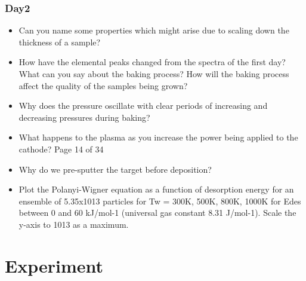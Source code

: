 \documentclass[]{article}
\begin{document}
\subsubsection{Day2}
\begin{itemize}
	 \item Can you name some properties which might arise due to scaling down the thickness of a sample? \item How have the elemental peaks changed from the spectra of the ﬁrst day? What can you say about the baking process? How will the baking process aﬀect the quality of the samples being grown? \item Why does the pressure oscillate with clear periods of increasing and decreasing pressures during baking? \item What happens to the plasma as you increase the power being applied to the cathode?
	Page 14 of 34
	\item Why do we pre-sputter the target before deposition? \item  Plot the Polanyi-Wigner equation as a function of desorption energy for an ensemble of 5.35x1013 particles for Tw = 300K, 500K, 800K, 1000K for Edes between 0 and 60 kJ/mol-1 (universal gas constant 8.31 J/mol-1). Scale the y-axis to 1013 as a maximum.
	
\end{itemize}
\section{Experiment}
\end{document}
